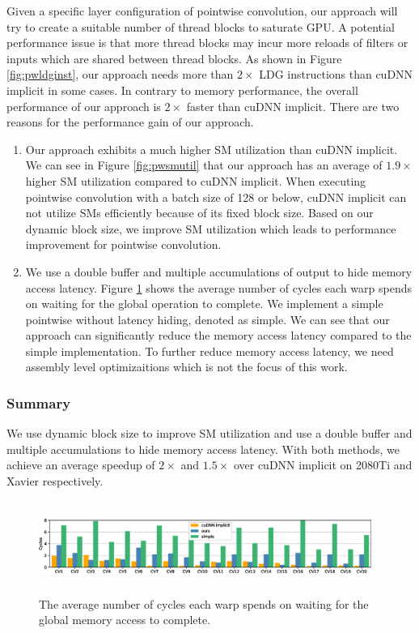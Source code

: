 Given a specific layer configuration of pointwise convolution, our approach will try to create a suitable number of thread blocks to saturate GPU. 
A potential performance issue is that more thread blocks may incur more reloads of filters or inputs which are shared between thread blocks. 
As shown in Figure \ref{fig:pwldginst}, our approach needs more than $2\times$ LDG instructions than cuDNN implicit in some cases.
In contrary to memory performance, the overall performance of our approach is $2\times$ faster than cuDNN implicit.
There are two reasons for the performance gain of our approach. 
\begin{enumerate}
	\item Our approach exhibits a much higher SM utilization than cuDNN implicit.
	We can see in Figure \ref{fig:pwsmutil} that our approach has an average of $1.9\times$ higher SM utilization compared to cuDNN implicit.
	When executing pointwise convolution with a batch size of 128 or below, cuDNN implicit can not utilize SMs efficiently because of its fixed block size. 
	Based on our dynamic block size, we improve SM utilization which leads to performance improvement for pointwise convolution.
	\item We use a double buffer and multiple accumulations of output to hide memory access latency.
	Figure \ref{fig:stalllongscore} shows the average number of cycles each warp spends on waiting for the global operation to complete. 
	We implement a simple pointwise without latency hiding, denoted as simple. 
	We can see that our approach can significantly reduce the memory access latency compared to the simple implementation.
	To further reduce memory access latency, we need assembly level optimizaitions which is not the focus of this work.
\end{enumerate}

\subsubsection{Summary} We use dynamic block size to improve SM utilization and use a double buffer and multiple accumulations to hide memory access latency. With both methods, we achieve an average speedup of $2\times$ and $1.5\times$ over cuDNN implicit on 2080Ti and Xavier respectively.


\begin{figure}
    \centering
    \includegraphics[width=0.97\textwidth,height=3cm]{./figure/longscore.eps}
    \caption{The average number of cycles each warp spends on waiting for the global memory access to complete.}
    \label{fig:stalllongscore}
\end{figure}

